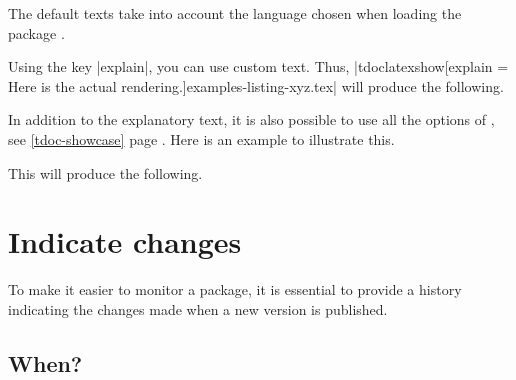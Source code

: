\begin{tdocnote}
    The default texts take into account the language chosen when loading the package .
\end{tdocnote}




\begin{tdocexa}
    Using the key \tdocinlatex|explain|, you can use custom text. Thus, \tdocinlatex|tdoclatexshow[explain = Here is the actual rendering.]{examples-listing-xyz.tex}| will produce the following.

    \newpage

    \begin{tdoc-doc-showcase}
    \end{tdoc-doc-showcase}
\end{tdocexa}




\begin{tdocexa}
    In addition to the explanatory text, it is also possible to use all the options of , see \ref{tdoc-showcase} page \pageref{tdoc-showcase}.
    Here is an example to illustrate this.

    \medskip


    \medskip

    This will produce the following.

    \medskip

    \begin{tdoc-doc-showcase}
        
    \end{tdoc-doc-showcase}
\end{tdocexa}


\section{Indicate changes}

To make it easier to monitor a package, it is essential to provide a history indicating the changes made when a new version is published.




\subsection{When?}


